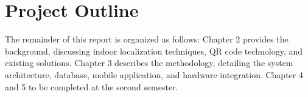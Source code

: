 \section{Project Outline}

The remainder of this report is organized as follows: Chapter 2 provides the background,  discussing indoor localization techniques, QR code technology, and existing solutions. Chapter 3 describes the methodology, detailing the system architecture, database, mobile application, and hardware integration. Chapter 4 and 5 to be completed at the second semester. 